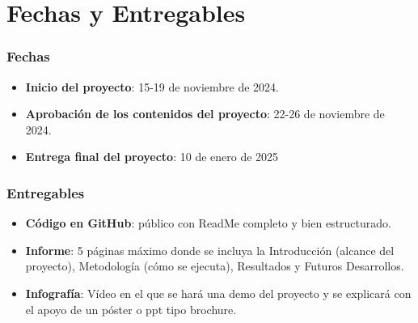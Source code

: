\chapter{\textbf{Fechas y Entregables}}
\label{chapter:fechas_entregables}

\subsection*{Fechas}
{}
\vspace{5mm}

\begin{itemize}
    \item \textbf{Inicio del proyecto}: 15-19 de noviembre de 2024.
    \item \textbf{Aprobación de los contenidos del proyecto}: 22-26 de noviembre de 2024.
    \item \textbf{Entrega final del proyecto}: 10 de enero de 2025
\end{itemize}

\subsection*{Entregables}
{}
\vspace{5mm}

\begin{itemize}
    \item \textbf{Código en GitHub}: público con ReadMe completo y bien estructurado.
    \item \textbf{Informe}: 5 páginas máximo donde se incluya la Introducción (alcance del proyecto), Metodología (cómo se ejecuta), Resultados y Futuros Desarrollos.
    \item \textbf{Infografía}: Vídeo en el que se hará una demo del proyecto y se explicará con el apoyo de un póster o ppt tipo brochure. 
\end{itemize}